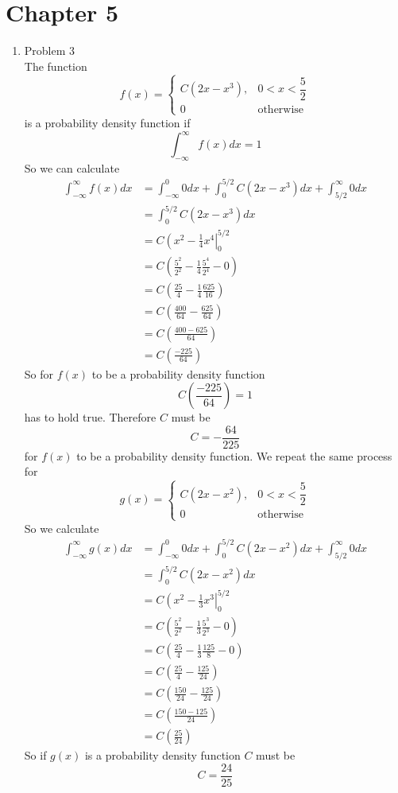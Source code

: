 \documentclass[11pt]{article}
\begin{document}

\section{Chapter 5}
\begin{enumerate}
\item Problem 3\\
The function 
$$f(x) = \left\{\begin{array}{lc}
		C(2x-x^3), &0<x<\dfrac{5}{2}\\
		0	& \mbox{otherwise}
		\end{array}\right.$$
is a probability density function if
$$\int_{-\infty}^{\infty} f(x)dx = 1$$
So we can calculate
\begin{align*}
\int_{-\infty}^{\infty} f(x)dx &= \int_{-\infty}^{0} 0dx + \int_{0}^{5/2}C(2x-x^3) dx +\int_{5/2}^{\infty} 0dx\\
&= \int_{0}^{5/2}C(2x-x^3) dx \\
&= C\left(x^2-\frac{1}{4}x^4\right|_{0}^{5/2}\\
&= C\left(\frac{5^2}{2^2}-\frac{1}{4}\frac{5^4}{2^4} - 0\right)\\
&= C\left(\frac{25}{4}-\frac{1}{4}\frac{625}{16}\right)\\
&= C\left(\frac{400}{64}-\frac{625}{64}\right)\\
&= C\left(\frac{400-625}{64}\right)\\
&= C\left(\frac{-225}{64}\right)
\end{align*}
So for $f(x)$ to be a probability density function 
$$C\left(\frac{-225}{64}\right)=1$$
has to hold true. Therefore $C$ must be
$$C=-\frac{64}{225}$$
for $f(x)$ to be a probability density function. We repeat the same process for
$$g(x) = \left\{\begin{array}{lc}
		C(2x-x^2), &0<x<\dfrac{5}{2}\\
		0	& \mbox{otherwise}
		\end{array}\right.$$
So we calculate
\begin{align*}
\int_{-\infty}^{\infty} g(x)dx &= \int_{-\infty}^{0} 0dx + \int_{0}^{5/2}C(2x-x^2) dx +\int_{5/2}^{\infty} 0dx\\
&= \int_{0}^{5/2}C(2x-x^2) dx \\
&= C\left(x^2-\frac{1}{3}x^3\right|_{0}^{5/2}\\
&= C\left(\frac{5^2}{2^2}-\frac{1}{3}\frac{5^3}{2^3} - 0\right)\\
&= C\left(\frac{25}{4}-\frac{1}{3}\frac{125}{8} - 0\right)\\
&= C\left(\frac{25}{4}-\frac{125}{24}\right)\\
&= C\left(\frac{150}{24}-\frac{125}{24}\right)\\
&= C\left(\frac{150-125}{24}\right)\\
&= C\left(\frac{25}{24}\right)
\end{align*}
So if $g(x)$ is a probability density function $C$ must be
$$C=\frac{24}{25}$$


\end{enumerate}
\end{document}
